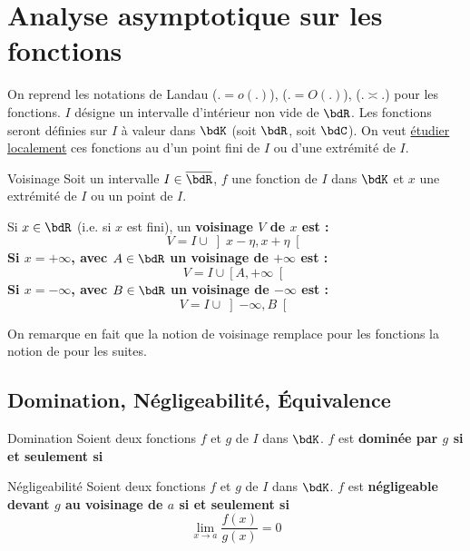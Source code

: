 \documentclass[a4paper,french,bookmarks]{article}
\begin{document}
\section{Analyse asymptotique sur les fonctions}

On reprend les notations de Landau  ($. = o(.)$),  ($. = O(.)$),  ($. \asymp .$) pour les fonctions. $I$ désigne un intervalle d'intérieur non vide de $\bdR$. Les fonctions seront définies sur $I$ à valeur dans $\bdK$ (soit $\bdR$, soit $\bdC$). On veut \underline{étudier localement} ces fonctions au  d'un point fini de $I$ ou d'une extrémité de $I$.

\begin{definition}{Voisinage}{}
    Soit un intervalle $I \in \overline{\bdR}$, $f$ une fonction de $I$ dans $\bdK$ et $x$ une extrémité de $I$ ou un point de $I$.
    
    \begin{enumerate}
        \itarr Si $x \in \bdR$ (i.e. si $x$ est fini), un \bf{voisinage $V$ de $x$} est :
        \[ V = I \cup \left]x - \eta, x + \eta\right[\]
        \itarr Si $x = +\infty$, avec $A \in \bdR$ un \bf{voisinage de $+\infty$} est :
        \[ V = I \cup \left[A, +\infty\right[\]
        \itarr Si $x = -\infty$, avec $B \in \bdR$ un \bf{voisinage de $-\infty$} est :
        \[ V = I \cup \left]-\infty, B\right[\]
    \end{enumerate}
\end{definition}
On remarque en fait que la notion de voisinage remplace pour les fonctions la notion de  pour les suites.

\subsection{Domination, Négligeabilité, Équivalence}

\begin{definition}{Domination}{}
    Soient deux fonctions $f$ et $g$ de $I$ dans $\bdK$. $f$ est \bf{dominée} par $g$ si et seulement si
\end{definition}

\begin{definition}{Négligeabilité}{}
    Soient deux fonctions $f$ et $g$ de $I$ dans $\bdK$. $f$ est \bf{négligeable} devant $g$ au voisinage de $a$ si et seulement si
    \[ \lim\limits_{x \to a} \dfrac{f(x)}{g(x)} = 0\]
\end{definition}
\end{document}
